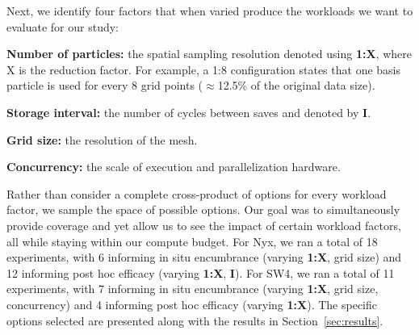 Next, we identify four factors that when varied produce the workloads we want to evaluate for our study:
\begin{tightItemize}
\item\textbf{Number of particles:} the spatial sampling resolution denoted using \textbf{1:X}, where X is the reduction factor. For example, a 1:8 configuration states that one basis particle is used for every 8 grid points ($\approx$12.5\% of the original data size).  
\item\textbf{Storage interval:} the number of cycles between saves and denoted by \textbf{I}.
\item\textbf{Grid size:} the resolution of the mesh. 
\item\textbf{Concurrency:} the scale of execution and parallelization hardware.
\end{tightItemize}
%
%
Rather than consider a complete cross-product of options for every workload factor, we sample the space of possible options.
%
Our goal was to simultaneously provide coverage and yet allow us to see the impact of certain workload factors, all while staying within our compute budget.
%
For Nyx, we ran a total of 18 experiments, with 6 informing in situ encumbrance (varying \textbf{1:X}, grid size) and 12 informing post hoc efficacy (varying \textbf{1:X}, \textbf{I}).
%
For SW4, we ran a total of 11 experiments, with 7 informing in situ encumbrance (varying \textbf{1:X}, grid size, concurrency) and 4 informing post hoc efficacy (varying \textbf{1:X}).
%
The specific options selected are presented along with the results in Section~\ref{sec:results}. 
